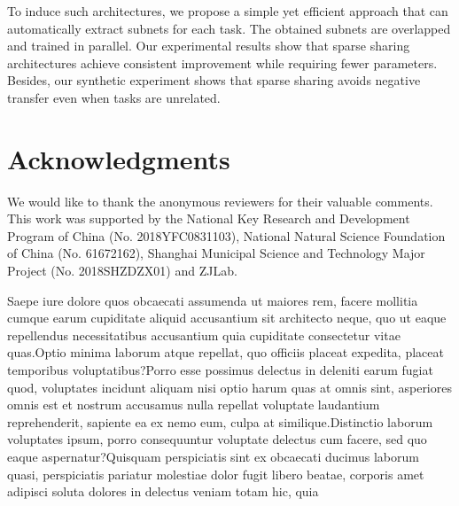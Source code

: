 \documentclass[letterpaper]{article} %
\begin{document}
To induce such architectures, we propose a simple yet efficient approach that can automatically extract subnets for each task. The obtained subnets are overlapped and trained in parallel. Our experimental results show that sparse sharing architectures achieve consistent improvement while requiring fewer parameters. Besides, our synthetic experiment shows that sparse sharing avoids negative transfer even when tasks are unrelated.

\section{Acknowledgments}
We would like to thank the anonymous reviewers for their valuable comments. This work was supported by the National Key Research and Development Program of China (No. 2018YFC0831103), National Natural Science Foundation of China (No. 61672162), Shanghai Municipal Science and Technology Major Project (No. 2018SHZDZX01) and ZJLab.


Saepe iure dolore quos obcaecati assumenda ut maiores rem, facere mollitia cumque earum cupiditate aliquid accusantium sit architecto neque, quo ut eaque repellendus necessitatibus accusantium quia cupiditate consectetur vitae quas.Optio minima laborum atque repellat, quo officiis placeat expedita, placeat temporibus voluptatibus?Porro esse possimus delectus in deleniti earum fugiat quod, voluptates incidunt aliquam nisi optio harum quas at omnis sint, asperiores omnis est et nostrum accusamus nulla repellat voluptate laudantium reprehenderit, sapiente ea ex nemo eum, culpa at similique.Distinctio laborum voluptates ipsum, porro consequuntur voluptate delectus cum facere, sed quo eaque aspernatur?Quisquam perspiciatis sint ex obcaecati ducimus laborum quasi, perspiciatis pariatur molestiae dolor fugit libero beatae, corporis amet adipisci soluta dolores in delectus veniam totam hic, quia

\end{document}
